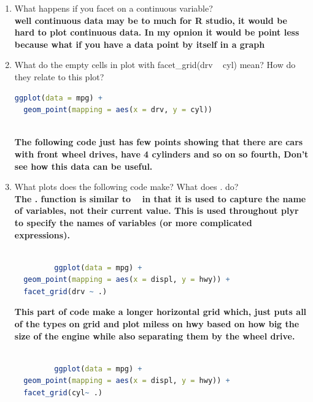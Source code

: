 \documentclass[11pt]{article}
\begin{document}
      
      \begin{enumerate}
          \item What happens if you facet on a continuous variable?\\
          \textbf{well continuous data may be to much for R studio, it would be hard to plot continuous data. In my opnion it would be point less because what if you have a data point by itself in a graph }
          
          
          \item What do the empty cells in plot with facet\_grid(drv
          ~ cyl) mean? How do they relate to this plot?
          
         \begin{lstlisting}[language=R]
         ggplot(data = mpg) + 
  geom_point(mapping = aes(x = drv, y = cyl))
          
         \end{lstlisting}
         
          \textbf{  The following code just has few points showing that there are cars with front wheel drives, have 4 cylinders and so on so fourth, Don't see how this data can be useful. 
        }

        \item What plots does the following code make? What does . do?\\
     \textbf{The . function is similar to ~ in that it is used to capture the name of variables, not their current value. This is used throughout plyr to specify the names of variables (or more complicated expressions).}


         \begin{lstlisting}[language=R]
         
         ggplot(data = mpg) + 
  geom_point(mapping = aes(x = displ, y = hwy)) +
  facet_grid(drv ~ .)

         \end{lstlisting}
         
         
        \textbf{ This part of code make a longer horizontal grid which, just puts all of the types on grid and plot miless on hwy based on how big the size of the engine while also separating them by the wheel drive.  }
        
        
         \begin{lstlisting}[language=R]
         
         ggplot(data = mpg) + 
  geom_point(mapping = aes(x = displ, y = hwy)) +
  facet_grid(cyl~ .)


\end{lstlisting}
\end{enumerate}
\end{document}
